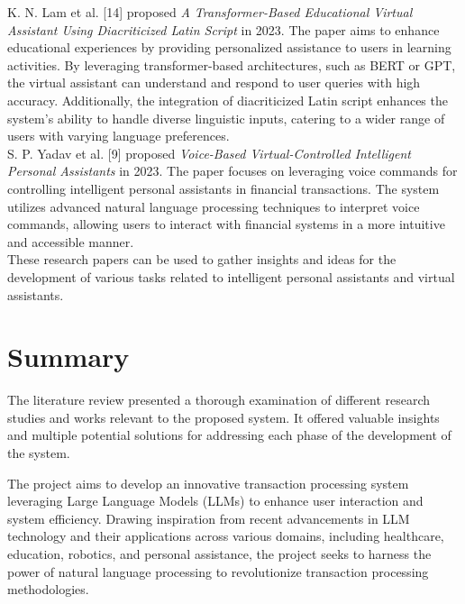 \noindent
K. N. Lam et al. [14] proposed {\it A Transformer-Based Educational Virtual Assistant Using Diacriticized Latin Script} in 2023. 
\noindent
The paper aims to enhance educational experiences by providing personalized assistance to users in learning activities. By leveraging transformer-based architectures, such as BERT or GPT, the virtual assistant can understand and respond to user queries with high accuracy. Additionally, the integration of diacriticized Latin script enhances the system's ability to handle diverse linguistic inputs, catering to a wider range of users with varying language preferences.  \\

\noindent
S. P. Yadav et al. [9] proposed {\it Voice-Based Virtual-Controlled Intelligent Personal Assistants} in 2023.
\noindent
The paper focuses on leveraging voice commands for controlling intelligent personal assistants in financial transactions. The system utilizes advanced natural language processing techniques to interpret voice commands, allowing users to interact with financial systems in a more intuitive and accessible manner. \\

\noindent
These research papers can be used to gather insights and ideas for the development of various tasks related to intelligent personal assistants and virtual assistants. 

\clearpage



\section{Summary}

\noindent 
The literature review presented a thorough examination of different research studies and works relevant to the proposed system. It offered valuable insights and multiple potential solutions for addressing each phase of the development of the system.

\vspace{3mm}

\noindent
The project aims to develop an innovative transaction processing system leveraging Large Language Models (LLMs) to enhance user interaction and system efficiency. Drawing inspiration from recent advancements in LLM technology and their applications across various domains, including healthcare, education, robotics, and personal assistance, the project seeks to harness the power of natural language processing to revolutionize transaction processing methodologies.

